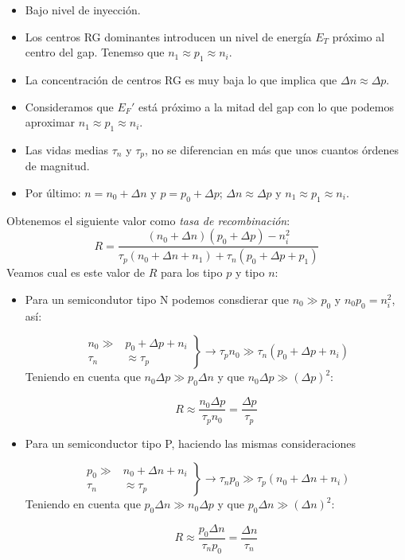 \begin{itemize}
	\item Bajo nivel de inyección.
	\item Los centros RG dominantes introducen un nivel de energía $E_T$ próximo al centro del gap. Tenemso que $n_1\approx p_1\approx n_i$.
	\item La concentración de centros RG es muy baja lo que implica que $\Delta n \approx \Delta p$.
	\item Consideramos que $E_F'$ está próximo a la mitad del gap con lo que podemos aproximar $n_1\approx p_1\approx n_i$.
	\item Las vidas medias $\tau_n$ y $\tau_p$, no se diferencian en más que unos cuantos órdenes de magnitud.
	\item Por último: $n=n_0 + \Delta n$ y $p=p_0+\Delta p$; $\Delta n \approx \Delta p$ y $n_1 \approx p_1 \approx n_i$.
\end{itemize}
Obtenemos el siguiente valor como \textit{tasa de recombinación}:
\begin{equation}
	R = \frac{(n_0+\Delta n)(p_0 + \Delta p)-n_i^2}{\tau_p(n_0+\Delta n + n_1)+\tau_n (p_0 + \Delta p + p_1)}
\end{equation}
Veamos cual es este valor de $R$ para los tipo $p$ y tipo $n$:
\begin{itemize}
	\item Para un semicondutor tipo N podemos consdierar que $n_0\gg p_0$ y $n_0 p_0 = n_i^2$, así:

	      \begin{equation}
		      \left.
		      \begin{split}
			      n_0 \gg & p_0 + \Delta p + n_i \\
			      \tau_n  & \approx \tau_p
		      \end{split}
		      \right\rbrace \rightarrow \tau_p n_0 \gg \tau_n (p_0 + \Delta p + n_i)
	      \end{equation}
	      Teniendo en cuenta que $n_0\Delta p\gg p_0\Delta n$ y que $n_0 \Delta p \gg (\Delta p)^2$:

	      \begin{equation}
		      R \approx \frac{n_0\Delta p}{\tau_p n_0} = \frac{\Delta p}{\tau_p}
	      \end{equation}
	\item Para un semiconductor tipo P, haciendo las mismas consideraciones

	      \begin{equation}
		      \left.
		      \begin{split}
			      p_0 \gg & n_0 + \Delta n + n_i \\
			      \tau_n  & \approx \tau_p
		      \end{split}
		      \right\rbrace \rightarrow \tau_n p_0 \gg \tau_p (n_0 + \Delta n + n_i)
	      \end{equation}
	      Teniendo en cuenta que $p_0\Delta n\gg n_0\Delta p$ y que $p_0 \Delta n \gg (\Delta n)^2$:

	      \begin{equation}
		      R \approx \frac{p_0\Delta n}{\tau_n p_0} = \frac{\Delta n}{\tau_n}
	      \end{equation}
\end{itemize}

